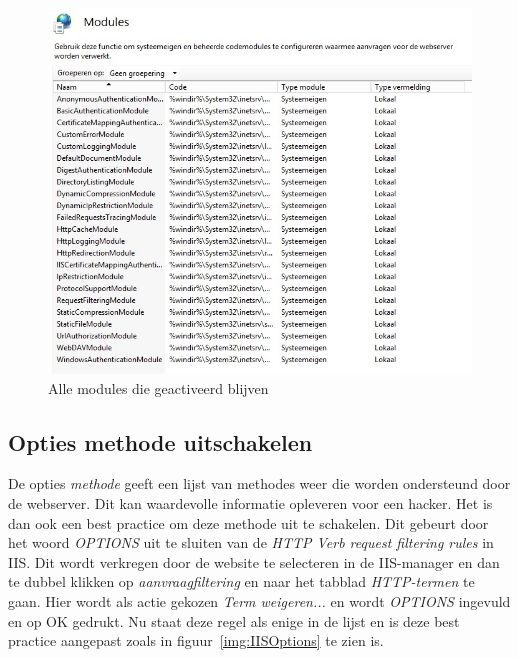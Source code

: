 \documentclass[pdftex,a4paper,12pt]{report}
\begin{document}
\begin{figure}[H]
\begin{center}
\includegraphics[scale=0.60]{img/IIS_Modules}
\end{center}
\caption{Alle modules die geactiveerd blijven}
\label{img:IISModules}
\end{figure}

\subsection{Opties methode uitschakelen}
De opties \textit{methode} geeft een lijst van methodes weer die worden ondersteund door de webserver. Dit kan waardevolle informatie opleveren voor een hacker. Het is dan ook een best practice om deze methode uit te schakelen. Dit gebeurt door het woord \textit{OPTIONS} uit te sluiten van de \textit{HTTP Verb request filtering rules} in IIS. Dit wordt verkregen door de website te selecteren in de IIS-manager en dan te dubbel klikken op \textit{aanvraagfiltering} en naar het tabblad \textit{HTTP-termen} te gaan. Hier wordt als actie gekozen \textit{Term weigeren...} en wordt \textit{OPTIONS} ingevuld en op OK gedrukt. Nu staat deze regel als enige in de lijst en is deze best practice aangepast zoals in figuur~\ref{img:IISOptions} te zien is. \citep{Darmanin2014}
\end{document}
